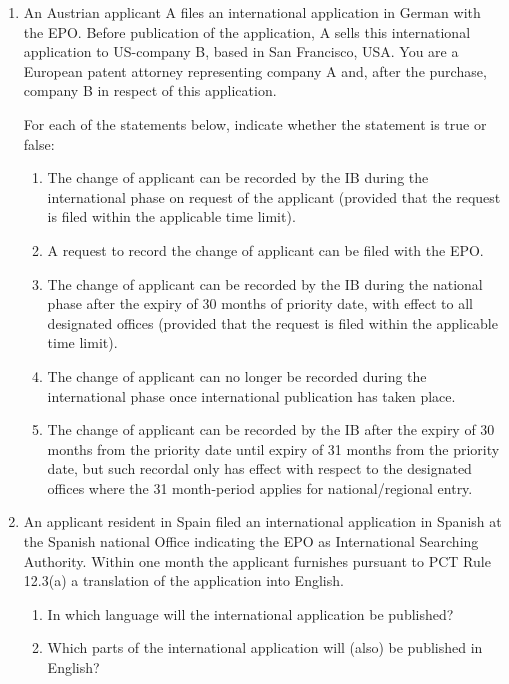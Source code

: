 \documentclass{report}
\begin{document}
\begin{enumerate}[label=\textbf{Question \arabic*}]

    \item %
   An Austrian applicant A files an international application in German with the EPO. Before publication of the application, A sells this international application to US-company B, based in San Francisco, USA.
You are a European patent attorney representing company A and, after the purchase, company B in respect of this application.


For each of the statements below, indicate whether the statement is true or false:

    \begin{enumerate}[label=(\alph*)]
        \item  The change of applicant can be recorded by the IB during the international phase on request of the applicant (provided that the request is filed within the applicable time limit). 
\item A request to record the change of applicant can be filed with the EPO.
\item The change of applicant can be recorded by the IB during the national phase after the expiry of 30 months of priority date, with effect to all designated offices (provided that the request is filed within the applicable time limit).
\item The change of applicant can no longer be recorded during the international phase once international publication has taken place. 
\item The change of applicant can be recorded by the IB after the expiry of 30 months from the priority date until expiry of 31 months from the priority date, but such recordal only has effect with respect to the designated offices where the 31
month-period applies for national/regional entry.

   \end{enumerate}
    
    \item %
An applicant resident in Spain filed an international application in Spanish at the Spanish national Office indicating the EPO as International Searching Authority. Within one month the applicant furnishes pursuant to PCT Rule 12.3(a) a translation of the application into English.
    \begin{enumerate}[label=(\alph*)]
        \item   In which language will the international application be published?
\item  Which parts of the international application will (also) be published in English?
    \end{enumerate}

    \end{enumerate}
    
\end{document}

